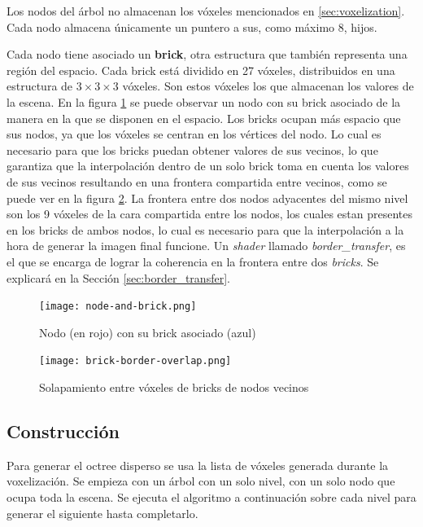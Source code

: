 Los nodos del árbol no almacenan los vóxeles mencionados en \ref{sec:voxelization}.
Cada nodo almacena únicamente un puntero a sus, como máximo $8$, hijos.

Cada nodo tiene asociado un \textbf{brick}, otra estructura que también representa una región del espacio.
Cada brick está dividido en 27 vóxeles, distribuidos en una estructura de $3\times3\times3$ vóxeles.
Son estos vóxeles los que almacenan los valores de la escena.
En la figura \ref{fig:node_and_brick} se puede observar un nodo con su brick asociado de la manera en la que se disponen en el espacio.
Los bricks ocupan más espacio que sus nodos, ya que los vóxeles se centran en los vértices del nodo.
Lo cual es necesario para que los bricks puedan obtener valores de sus vecinos, lo que garantiza que la interpolación dentro de un solo brick toma en cuenta los valores de sus vecinos resultando en una frontera compartida entre vecinos, como se puede ver en la figura \ref{fig:brick_border_overlap}.
La frontera entre dos nodos adyacentes del mismo nivel son los 9 vóxeles de la cara compartida entre los nodos, los cuales estan presentes en los bricks de ambos nodos, lo cual es necesario para que la interpolación a la hora de generar la imagen final funcione.
Un \textit{shader} llamado \textit{border\_transfer}, es el que se encarga de lograr la coherencia en la frontera entre dos \textit{bricks}.
Se explicará en la Sección \ref{sec:border_transfer}.

\begin{figure}[h!]
    \centering
    \texttt{[image: node-and-brick.png]}
    \caption{Nodo (en rojo) con su brick asociado (azul)}
    \label{fig:node_and_brick}
\end{figure}

\begin{figure}[h!]
    \centering
    \texttt{[image: brick-border-overlap.png]}
    \caption{Solapamiento entre vóxeles de bricks de nodos vecinos}
    \label{fig:brick_border_overlap}
\end{figure}

\subsection{Construcción}\label{design:svo_construction}

Para generar el octree disperso se usa la lista de vóxeles generada durante la voxelización.
Se empieza con un árbol con un solo nivel, con un solo nodo que ocupa toda la escena.
Se ejecuta el algoritmo a continuación sobre cada nivel para generar el siguiente hasta completarlo.

